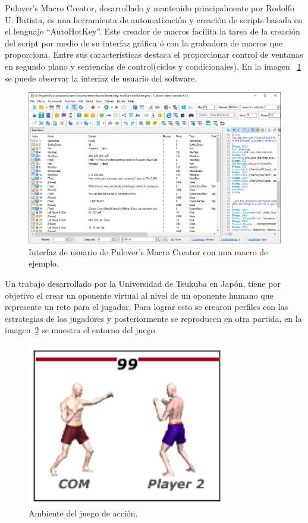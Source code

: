 Pulover's Macro Creator\cite{Batista}, desarrollado y mantenido
 principalmente por Rodolfo U. Batista, es una herramienta de automatización
 y creación de scripts basada en el lenguaje ``AutoHotKey''. Este creador de
 macros facilita la tarea de la creación del script por medio de su interfaz
 gráfica ó con la grabadora de macros que proporciona. Entre sus
 características destaca el proporcionar control de ventanas en segundo plano
 y sentencias de control(ciclos y condicionales). En la imagen
 ~\ref{fig:macros} se puede observar la interfaz de usuario del software.


\begin{figure}[H]
\centering
\includegraphics[width=0.7\columnwidth]{CapituloI/Imagenes/Macros.png}
\caption{Interfaz de usuario de Pulover's Macro Creator con una macro de
 ejemplo.}
\label{fig:macros}
\end{figure}



Un trabajo desarrollado por la Universidad de Tsukuba en
 Japón\cite{Nakano2006}, tiene por objetivo el crear un oponente virtual
 al nivel de un oponente humano que represente un reto para el jugador. Para
 lograr esto se crearon perfiles con las estrategias de los jugadores y
 posteriormente se reproducen en otra partida, en la imagen~\ref{fig:imitat}
 se muestra el entorno del juego.


\begin{figure}[H]
\centering
\includegraphics[width=0.5\columnwidth]{CapituloI/Imagenes/Imitating.png}
\caption{Ambiente del juego de acción.}
\label{fig:imitat}
\end{figure}


